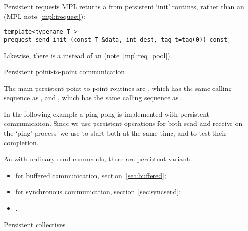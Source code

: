 \begin{mplnote}{Persistent requests}
  MPL returns a 
  from persistent `init' routines, rather than an 
  (MPL note~\ref{mpl:irequest}):
\begin{lstlisting}
template<typename T >
prequest send_init (const T &data, int dest, tag t=tag(0)) const;
\end{lstlisting}
Likewise, there is a 
instead of an  (note~\ref{mpl:req_pool}).
\end{mplnote}

 {Persistent point-to-point communication}
\label{sec:persist-p2p}

The main persistent point-to-point routines are
, which has the same calling sequence as
, and , which has the same
calling sequence as .
  
In the following example a ping-pong is implemented with persistent communication.
Since we use persistent operations for both send and receive on the `ping' process,
we use  to start both at the same time,
and  to test their completion.
%  
%

As with ordinary send commands, there are persistent variants
\begin{itemize}
\item
   for buffered communication,
  section~\ref{sec:buffered};
\item
   for synchronous communication,
  section~\ref{sec:syncsend};
\item
  .
\end{itemize}


 {Persistent collectives}

